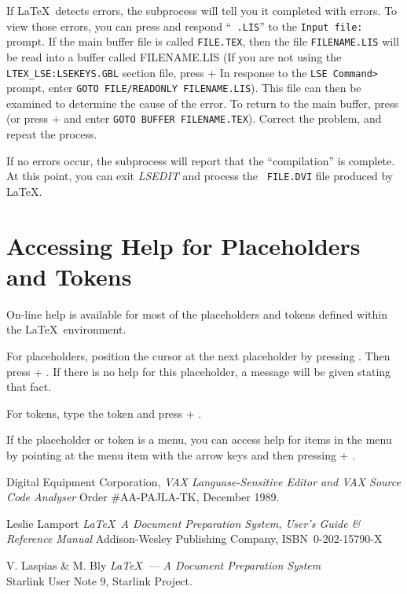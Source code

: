 If \LaTeX\ detects errors, the subprocess will tell you it completed with
errors. To view those errors, you can press   and respond ``{\tt
.LIS}'' to the {\tt \us Input file:} prompt. If the main buffer file is called
{\tt FILE.TEX}, then the file {\tt FILENAME.LIS} will be read into a buffer
called FILENAME.LIS (If you are not using the {\tt LTEX\_LSE:LSEKEYS.GBL}
section file, press \gold +  In response to the  \verb"LSE Command>"
prompt, enter {\tt GOTO FILE/READONLY FILENAME.LIS}).   This file can then be
examined to determine the cause of the error. To return to the main buffer,
press   (or press \gold +  and enter {\tt GOTO BUFFER
FILENAME.TEX}). Correct the problem, and repeat the process.

If no errors occur, the subprocess will report that the ``compilation'' is
complete. At this point, you can exit {\sl LSEDIT\/} and process the {\tt
FILE.DVI} file produced by \LaTeX.

\section{Accessing Help for Placeholders and Tokens}

On-line help is available for most of the placeholders and tokens defined
within the \LaTeX\ environment.

For placeholders, position the cursor at the next placeholder by pressing
\nolinebreak. Then press \gold + \help. If there is no help for this
placeholder, a message will be given stating that fact.

For tokens, type the token and press \gold + \help.

If the placeholder or token is a menu, you can access help for items in the
menu by pointing at the menu item with the arrow keys and then pressing \gold +
\help.

\begin{thebibliography}{99}

 Digital Equipment Corporation,
{\em VAX Languase-Sensitive Editor and VAX Source Code Analyser}
Order \#AA-PAJLA-TK, December 1989.

 Leslie Lamport {\em \LaTeX\ A Document Preparation System,
User's Guide \& Reference Manual \/} Addison-Wesley Publishing Company,
ISBN~0-202-15790-X

 V. Laspias \& M. Bly {\em \LaTeX\ --- A Document Preparation
System} \\
Starlink User Note 9, Starlink Project.

\end{thebibliography}

